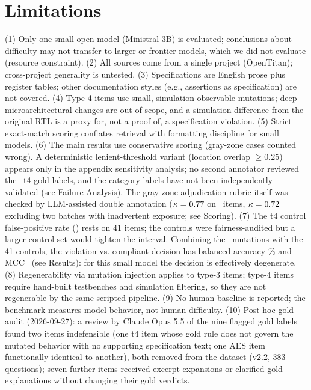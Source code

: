 \documentclass[11pt]{article}
\begin{document}
\section{Limitations}
(1) Only one small open model (Ministral-3B) is evaluated; conclusions about difficulty may not transfer to larger or frontier models, which we did not evaluate (resource constraint). (2) All sources come from a single project (OpenTitan); cross-project generality is untested. (3) Specifications are English prose plus register tables; other documentation styles (e.g., assertions as specification) are not covered. (4) Type-4 items use small, simulation-observable mutations; deep microarchitectural changes are out of scope, and a simulation difference from the original RTL is a proxy for, not a proof of, a specification violation. (5) Strict exact-match scoring conflates retrieval with formatting discipline for small models. (6) The main results use conservative scoring (gray-zone cases counted wrong). A deterministic lenient-threshold variant (location overlap $\ge 0.25$) appears only in the appendix sensitivity analysis; no second annotator reviewed the \NTfour\ t4 gold labels, and the category labels have not been independently validated (see Failure Analysis). The gray-zone adjudication rubric itself was checked by LLM-assisted double annotation ($\kappa=0.77$ on \AdjudN\ items, $\kappa=0.72$ excluding two batches with inadvertent exposure; see Scoring). (7) The t4 control false-positive rate (\CtrlFPR) rests on 41 items; the controls were fairness-audited but a larger control set would tighten the interval. Combining the \NTfour\ mutations with the 41 controls, the violation-vs.-compliant decision has balanced accuracy \DecBalAcc\% and MCC \DecMCC\ (see Results): for this small model the decision is effectively degenerate. (8) Regenerability via mutation injection applies to type-3 items; type-4 items require hand-built testbenches and simulation filtering, so they are not regenerable by the same scripted pipeline. (9) No human baseline is reported; the benchmark measures model behavior, not human difficulty. (10) Post-hoc gold audit (2026-09-27): a review by Claude Opus 5.5 of the nine flagged gold labels found two items indefensible (one t4 item whose gold rule does not govern the mutated behavior with no supporting specification text; one AES item functionally identical to another), both removed from the dataset (v2.2, 383 questions); seven further items received excerpt expansions or clarified gold explanations without changing their gold verdicts.
\end{document}
